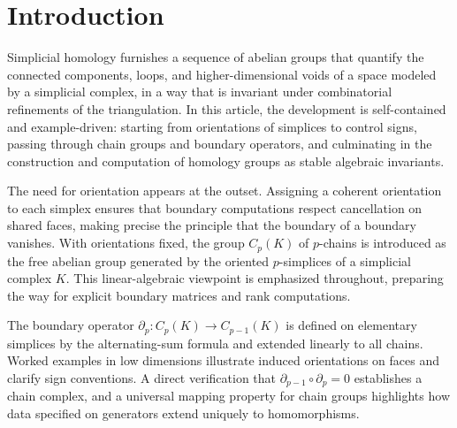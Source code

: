 \documentclass[12pt,oneside,reqno]{amsart}
\theoremstyle{plain}
\theoremstyle{definition}
\theoremstyle{remark}
\newcommand{\0}{{\textbf{0}}}
\begin{document}
\maketitle
\tableofcontents %
\section{Introduction}\label{s:Introduction}

Simplicial homology furnishes a sequence of abelian groups that quantify the connected components, loops, and higher-dimensional voids of a space modeled by a simplicial complex, in a way that is invariant under combinatorial refinements of the triangulation. In this article, the development is self-contained and example-driven: starting from orientations of simplices to control signs, passing through chain groups and boundary operators, and culminating in the construction and computation of homology groups as stable algebraic invariants.

The need for orientation appears at the outset. Assigning a coherent orientation to each simplex ensures that boundary computations respect cancellation on shared faces, making precise the principle that the boundary of a boundary vanishes. With orientations fixed, the group \(C_p(K)\) of \(p\)-chains is introduced as the free abelian group generated by the oriented \(p\)-simplices of a simplicial complex \(K\). This linear-algebraic viewpoint is emphasized throughout, preparing the way for explicit boundary matrices and rank computations.

The boundary operator \(\partial_p \colon C_p(K)\to C_{p-1}(K)\) is defined on elementary simplices by the alternating-sum formula and extended linearly to all chains. Worked examples in low dimensions illustrate induced orientations on faces and clarify sign conventions. A direct verification that \(\partial_{p-1}\circ \partial_p = 0\) establishes a chain complex, and a universal mapping property for chain groups highlights how data specified on generators extend uniquely to homomorphisms.
\end{document}
